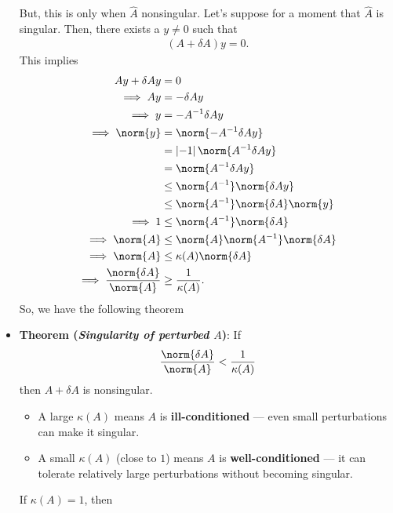 \documentclass{report}
\begin{document}
\begin{itemize}
        But, this is only when $\hat{A}$ nonsingular. Let's suppose for a moment that $\hat{A}$ is singular. Then, there exists a $y\ne 0$ such that
        \begin{align*}
            (A + \delta  A)y = 0
        .\end{align*}
        This implies
        \begin{align*}
            Ay + \delta Ay &= 0 \\
            \implies Ay &= - \delta Ay \\
            \implies y &= -A^{-1} \delta  A y \\
            \implies \norm{y} &= \norm{-A^{-1}\delta  Ay} \\
                              &= \left\lvert -1 \right\rvert \norm{A^{-1}\delta  A y} \\
                              &= \norm{A^{-1} \delta Ay} \\
                              & \leq \norm{A^{-1}} \norm{\delta  Ay} \\
                              & \leq \norm{A^{-1}}\norm{\delta  A}\norm{y} \\
            \implies 1 &\leq \norm{A^{-1}}\norm{\delta A}\\
            \implies \norm{A}& \leq \norm{A}\norm{A^{-1}}\norm{\delta A}\\
            \implies \norm{A} & \leq \kappa(A) \norm{\delta  A} \\
            \implies \frac{\norm{\delta A}}{\norm{A}} & \geq \frac{1}{\kappa(A)}
        .\end{align*}
        So, we have the following theorem
    \item \textbf{Theorem (\textit{Singularity of perturbed $A$})}: If
        \begin{align*}
            \frac{\norm{\delta A}}{\norm{A}} < \frac{1}{\kappa(A)}
        \end{align*}
        then $A + \delta  A$ is nonsingular.
        \bigbreak \noindent 
        \begin{itemize}
            \item A large $\kappa(A)$ means $A$ is \textbf{ill-conditioned} — even small perturbations can make it singular.
            \item A small $\kappa(A)$ (close to $1$) means $A$ is \textbf{well-conditioned} — it can tolerate relatively large perturbations without becoming singular.
        \end{itemize}
        If $\kappa(A) = 1$, then

\end{itemize}
\end{document}
